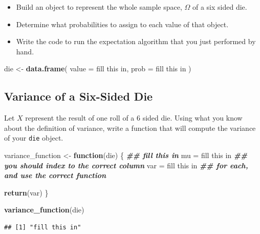 \documentclass[
]{book}
\newenvironment{Shaded}{\begin{snugshade}}{\end{snugshade}}
\newcommand{\AttributeTok}[1]{\textcolor[rgb]{0.13,0.29,0.53}{#1}}
\newcommand{\ControlFlowTok}[1]{\textcolor[rgb]{0.13,0.29,0.53}{\textbf{#1}}}
\newcommand{\DocumentationTok}[1]{\textcolor[rgb]{0.56,0.35,0.01}{\textbf{\textit{#1}}}}
\newcommand{\FunctionTok}[1]{\textcolor[rgb]{0.13,0.29,0.53}{\textbf{#1}}}
\newcommand{\NormalTok}[1]{#1}
\newcommand{\OtherTok}[1]{\textcolor[rgb]{0.56,0.35,0.01}{#1}}
\newcommand{\StringTok}[1]{\textcolor[rgb]{0.31,0.60,0.02}{#1}}
\providecommand{\tightlist}{%
  \setlength{\itemsep}{0pt}\setlength{\parskip}{0pt}}
\theoremstyle{definition}
\theoremstyle{definition}
\theoremstyle{definition}
\theoremstyle{definition}
\theoremstyle{remark}
\begin{document}
\begin{itemize}
\tightlist
\item
  Build an object to represent the whole sample space, \(\Omega\) of a six sided die.
\item
  Determine what probabilities to assign to each value of that object.
\item
  Write the code to run the expectation algorithm that you just performed by hand.
\end{itemize}

\begin{Shaded}
\begin{Highlighting}[]
\NormalTok{die }\OtherTok{\textless{}{-}} \FunctionTok{data.frame}\NormalTok{(}
  \AttributeTok{value =} \StringTok{\textquotesingle{}fill this in\textquotesingle{}}\NormalTok{,}
  \AttributeTok{prob  =} \StringTok{\textquotesingle{}fill this in\textquotesingle{}}
\NormalTok{)}
\end{Highlighting}
\end{Shaded}

\hypertarget{variance-of-a-six-sided-die}{%
\subsection{Variance of a Six-Sided Die}\label{variance-of-a-six-sided-die}}

Let \(X\) represent the result of one roll of a 6 sided die. Using what you know about the definition of variance, write a function that will compute the variance of your \texttt{die} object.

\begin{Shaded}
\begin{Highlighting}[]
\NormalTok{variance\_function }\OtherTok{\textless{}{-}} \ControlFlowTok{function}\NormalTok{(die) \{ }
  \DocumentationTok{\#\# fill this in}
\NormalTok{  mu }\OtherTok{=} \StringTok{\textquotesingle{}fill this in\textquotesingle{}}   \DocumentationTok{\#\# you should index to the correct column}
\NormalTok{  var }\OtherTok{=} \StringTok{\textquotesingle{}fill this in\textquotesingle{}}  \DocumentationTok{\#\# for each, and use the correct function}
  
  \FunctionTok{return}\NormalTok{(var)}
\NormalTok{\}}

\FunctionTok{variance\_function}\NormalTok{(die)}
\end{Highlighting}
\end{Shaded}

\begin{verbatim}
## [1] "fill this in"
\end{verbatim}
\end{document}
